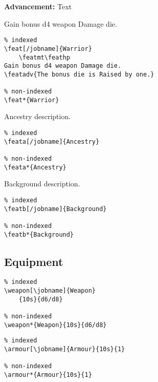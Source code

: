 \documentclass[itdr]{subfiles}
\begin{document}
\noindent\fbox{\lstinline!\\featmt!} \featmt

\vspace{-0.7\baselineskip}

\noindent\fbox{\lstinline!\\feathp!} \feathp

\vspace{-0.7\baselineskip}

\noindent{} \textbf{Advancement:} Text

\featmt\feathp
Gain bonus d4 weapon Damage die.

\begin{lstlisting}
% indexed
\feat[/jobname]{Warrior}
	\featmt\feathp
Gain bonus d4 weapon Damage die.
\featadv{The bonus die is Raised by one.}

% non-indexed
\feat*{Warrior}
\end{lstlisting}

Ancestry description.

\begin{lstlisting}
% indexed
\feata[/jobname]{Ancestry}

% non-indexed
\feata*{Ancestry}
\end{lstlisting}

Background description.

\begin{lstlisting}
% indexed
\featb[/jobname]{Background}

% non-indexed
\featb*{Background}
\end{lstlisting}

\break

\subsection{Equipment}

\begin{lstlisting}
% indexed
\weapon[\jobname]{Weapon}
	{10s}{d6/d8}

% non-indexed
\weapon*{Weapon}{10s}{d6/d8}
\end{lstlisting}

\begin{lstlisting}
% indexed
\armour[\jobname]{Armour}{10s}{1}

% non-indexed
\armour*{Armour}{10s}{1}
\end{lstlisting}
\end{document}

